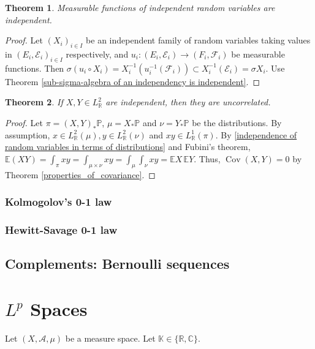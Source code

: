 \documentclass[11pt, a4paper, openany]{book}
\newtheorem{thm}{Theorem}\newtheorem{lem}{Lemma}\newtheorem{crl}{Corollary}
\theoremstyle{definition}
\DeclareMathOperator{\Cov}{Cov}
\begin{document}
    \begin{thm}
        Measurable functions of independent random variables are independent.
    \end{thm}
    \begin{proof}
        Let $(X_i)_{i\in I}$ be an independent family of random variables taking values in $(E_i,\mathscr{E}_i)_{i\in I}$ respectively, and $u_i:(E_i,\mathscr{E}_i)\rightarrow (F_i,\mathscr{F}_i)$ be measurable functions. Then $\sigma(u_i\circ X_i)=X_i^{-1}(u_i^{-1}(\mathscr{F}_i))\subset X_i^{-1}(\mathscr{E}_i)=\sigma X_i$. Use Theorem \ref{sub-sigma-algebra of an independency is independent}.
    \end{proof}
    \begin{thm}
        If $X,Y\in L^2_\mathbb{R}$ are independent, then they are uncorrelated.
    \end{thm}
    \begin{proof}
        Let $\pi=(X,Y)_*\mathbb{P}$, $\mu=X_*\mathbb{P}$ and $\nu=Y_*\mathbb{P}$ be the distributions. By assumption, $x\in L^2_\mathbb{R}(\mu), y\in L^2_\mathbb{R}(\nu)$ and $xy\in L^1_\mathbb{R}(\pi)$. By \ref{independence of random variables in terms of distributions} and Fubini's theorem, $\mathbb{E}(XY)=\int_\pi xy=\int_{\mu\times\nu}xy=\int_\mu \int_\nu xy=\mathbb{E}X\,\mathbb{E}Y$. Thus, $\Cov(X,Y)=0$ by Theorem \ref{properties_of_covariance}.
    \end{proof}
\subsection{Kolmogolov's 0-1 law}
\subsection{Hewitt-Savage 0-1 law}
\section{Complements: Bernoulli sequences}
\chapter{\texorpdfstring{$L^p$}{Lp} Spaces}
    Let $(X,\mathscr{A},\mu)$ be a measure space. Let $\mathbb{K}\in\{\mathbb{R},\mathbb{C}\}$.
\end{document}
